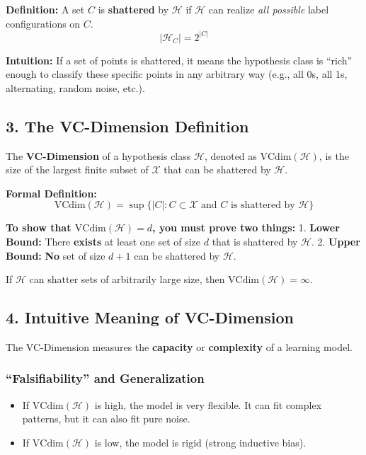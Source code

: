 \documentclass[
  italian,
  11pt,
]{article}
\providecommand{\tightlist}{%
  \setlength{\itemsep}{0pt}\setlength{\parskip}{0pt}}
\begin{document}
\textbf{Definition:} A set \(C\) is \textbf{shattered} by
\(\mathcal{H}\) if \(\mathcal{H}\) can realize \emph{all possible} label
configurations on \(C\). \[ |\mathcal{H}_C| = 2^{|C|} \]

\textbf{Intuition:} If a set of points is shattered, it means the
hypothesis class is ``rich'' enough to classify these specific points in
any arbitrary way (e.g., all 0s, all 1s, alternating, random noise,
etc.).

\subsection{3. The VC-Dimension
Definition}\label{the-vc-dimension-definition}

The \textbf{VC-Dimension} of a hypothesis class \(\mathcal{H}\), denoted
as \(\text{VCdim}(\mathcal{H})\), is the size of the largest finite
subset of \(\mathcal{X}\) that can be shattered by \(\mathcal{H}\).

\textbf{Formal Definition:}
\[ \text{VCdim}(\mathcal{H}) = \sup \{ |C| : C \subset \mathcal{X} \text{ and } C \text{ is shattered by } \mathcal{H} \} \]

\textbf{To show that \(\text{VCdim}(\mathcal{H}) = d\), you must prove
two things:} 1. \textbf{Lower Bound:} There \textbf{exists} at least one
set of size \(d\) that is shattered by \(\mathcal{H}\). 2. \textbf{Upper
Bound:} \textbf{No} set of size \(d+1\) can be shattered by
\(\mathcal{H}\).

If \(\mathcal{H}\) can shatter sets of arbitrarily large size, then
\(\text{VCdim}(\mathcal{H}) = \infty\).

\subsection{4. Intuitive Meaning of
VC-Dimension}\label{intuitive-meaning-of-vc-dimension}

The VC-Dimension measures the \textbf{capacity} or \textbf{complexity}
of a learning model.

\subsubsection{``Falsifiability'' and
Generalization}\label{falsifiability-and-generalization}

\begin{itemize}
\tightlist
\item
  If \(\text{VCdim}(\mathcal{H})\) is high, the model is very flexible.
  It can fit complex patterns, but it can also fit pure noise.
\item
  If \(\text{VCdim}(\mathcal{H})\) is low, the model is rigid (strong
  inductive bias).
\end{itemize}
\end{document}
